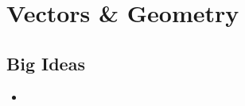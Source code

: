 \chapter{Vectors \& Geometry}
\label{chap:VAG}

\section{Big Ideas}
\label{sec:VAG Big Ideas}
\begin{itemize}
  \item 
\end{itemize}